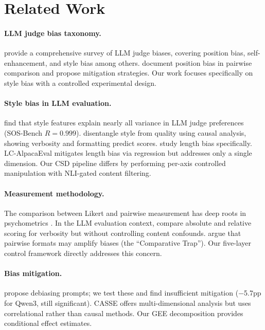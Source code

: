 \documentclass[11pt,a4paper]{article}
\begin{document}
\section{Related Work}

\paragraph{LLM judge bias taxonomy.}
\citet{stureborg2024large} provide a comprehensive survey of LLM judge biases, covering position bias, self-enhancement, and style bias among others. \citet{zheng2023judging} document position bias in pairwise comparison and propose mitigation strategies. Our work focuses specifically on style bias with a controlled experimental design.

\paragraph{Style bias in LLM evaluation.}
\citet{wu2023style} find that style features explain nearly all variance in LLM judge preferences (SOS-Bench $R=0.999$). \citet{park2024disentangling} disentangle style from quality using causal analysis, showing verbosity and formatting predict scores. \citet{chen2024humans} study length bias specifically. LC-AlpacaEval \citep{dubois2024length} mitigates length bias via regression but addresses only a single dimension. Our CSD pipeline differs by performing per-axis controlled manipulation with NLI-gated content filtering.

\paragraph{Measurement methodology.}
The comparison between Likert and pairwise measurement has deep roots in psychometrics \citep{thurstone1927law,stevens1946theory}. In the LLM evaluation context, \citet{saito2023verbosity} compare absolute and relative scoring for verbosity but without controlling content confounds. \citet{jeong2025comparative} argue that pairwise formats may amplify biases (the ``Comparative Trap''). Our five-layer control framework directly addresses this concern.

\paragraph{Bias mitigation.}
\citet{chen2024humans} propose debiasing prompts; we test these and find insufficient mitigation ($-$5.7pp for Qwen3, still significant). CASSE \citep{lu2024casse} offers multi-dimensional analysis but uses correlational rather than causal methods. Our GEE decomposition provides conditional effect estimates.
\end{document}
